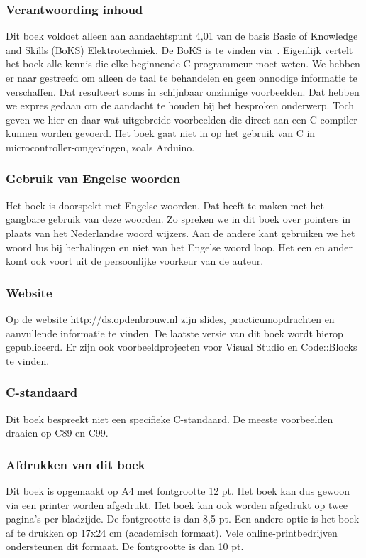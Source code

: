 \subsubsection*{Verantwoording inhoud}
Dit boek voldoet alleen aan aandachtspunt 4,01 van de basis Basic of Knowledge and Skills (BoKS) Elektrotechniek. De
BoKS is te vinden via~\cite{hboengineering2016boks}. Eigenlijk vertelt het boek alle kennis die elke beginnende C-programmeur moet weten. We hebben er naar gestreefd om alleen de taal te behandelen en geen onnodige informatie te verschaffen. Dat resulteert soms in schijnbaar onzinnige voorbeelden. Dat hebben we expres gedaan om de aandacht te houden bij het besproken onderwerp. Toch geven we hier en daar wat uitgebreide voorbeelden die direct aan een C-compiler kunnen worden gevoerd. Het boek gaat niet in op het gebruik van C in microcontroller-omgevingen, zoals Arduino.

\subsubsection*{Gebruik van Engelse woorden}
Het boek is doorspekt met Engelse woorden. Dat heeft te maken met het gangbare gebruik van deze woorden. Zo spreken we in dit boek over pointers in plaats van het Nederlandse woord wijzers. Aan de andere kant gebruiken we het woord lus bij herhalingen en niet van het Engelse woord loop. Het een en ander komt ook voort uit de persoonlijke voorkeur van de auteur.

\subsubsection*{Website}
Op de website \url{http://ds.opdenbrouw.nl} zijn slides, practicumopdrachten en aanvullende informatie te vinden. De laatste versie van dit boek wordt hierop gepubliceerd. Er zijn ook voorbeeldprojecten voor Visual Studio en Code::Blocks te vinden.

\subsubsection*{C-standaard}
Dit boek bespreekt niet een specifieke C-standaard. De meeste voorbeelden draaien op C89 en C99.

\subsubsection*{Afdrukken van dit boek}
Dit boek is opgemaakt op A4 met fontgrootte 12 pt. Het boek kan dus gewoon via een printer worden afgedrukt. Het boek kan ook worden afgedrukt op twee pagina's per bladzijde. De fontgrootte is dan 8,5 pt. Een andere optie is het boek af te drukken op 17x24 cm (academisch formaat). Vele online-printbedrijven ondersteunen dit formaat. De fontgrootte is dan 10 pt.

